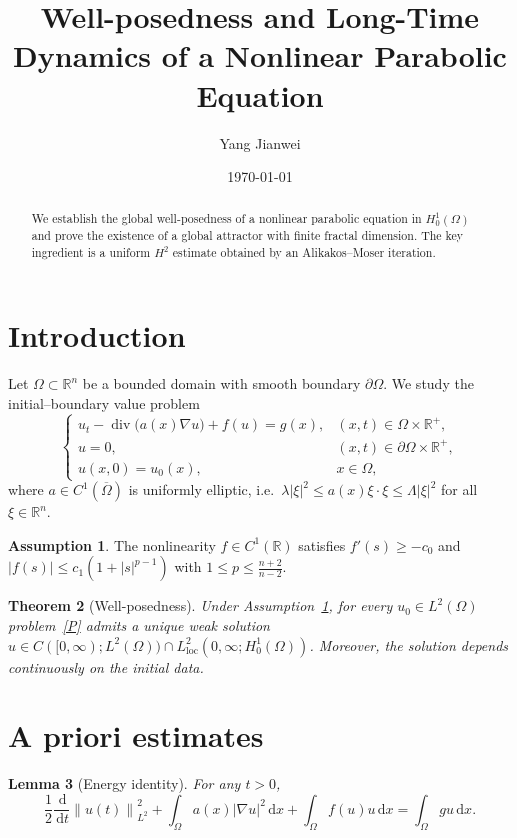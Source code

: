 \documentclass[11pt,a4paper]{article}
\title{Well-posedness and Long-Time Dynamics of a Nonlinear Parabolic Equation}
\author{Yang Jianwei}
\date{\today}
\newtheorem{theorem}{Theorem}[section]
\newtheorem{lemma}[theorem]{Lemma}
\theoremstyle{definition}
\newtheorem{assumption}[theorem]{Assumption}
\theoremstyle{remark}
\newcommand{\R}{\mathbb{R}}
\newcommand{\Om}{\Omega}
\newcommand{\paOm}{\partial\Omega}
\newcommand{\norm}[1]{\left\lVert #1\right\rVert}
\newcommand{\dd}{\,\mathrm{d}}
\DeclareMathOperator{\divg}{div}
\newcommand{\pde}[1]{\eqref{#1}}
\begin{document}
\maketitle

\begin{abstract}
We establish the global well-posedness of a nonlinear parabolic equation
in $H^1_0(\Omega)$ and prove the existence of a global attractor with
finite fractal dimension. The key ingredient is a uniform
$H^2$ estimate obtained by an Alikakos--Moser iteration.
\end{abstract}

\section{Introduction}

Let $\Om\subset\R^n$ be a bounded domain with smooth boundary $\paOm$.
We study the initial--boundary value problem
\begin{equation}\label{P}
  \begin{cases}
    u_t - \divg\bigl(a(x)\nabla u\bigr) + f(u) = g(x), & (x,t)\in\Om\times\R^+,\\[2pt]
    u = 0, & (x,t)\in\paOm\times\R^+,\\[2pt]
    u(x,0)=u_0(x), & x\in\Om,
  \end{cases}
\end{equation}
where $a\in C^1(\overline\Om)$ is uniformly elliptic, i.e.\
$\lambda|\xi|^2\le a(x)\xi\cdot\xi\le\Lambda|\xi|^2$ for all
$\xi\in\R^n$.

\begin{assumption}\label{A1}
The nonlinearity $f\in C^1(\R)$ satisfies
$f'(s)\ge -c_0$ and $|f(s)|\le c_1(1+|s|^{p-1})$ with
$1\le p\le \frac{n+2}{n-2}$.
\end{assumption}

\begin{theorem}[Well-posedness]\label{T1}
Under Assumption~\ref{A1}, for every $u_0\in L^2(\Om)$ problem~\pde{P}
admits a unique weak solution
$u\in C([0,\infty);L^2(\Om))\cap L^2_{\mathrm{loc}}(0,\infty;H^1_0(\Om))$.
Moreover, the solution depends continuously on the initial data.
\end{theorem}

\section{A priori estimates}

\begin{lemma}[Energy identity]\label{L1}
For any $t>0$,
\begin{equation}
  \frac12\frac{\dd}{\dd t}\norm{u(t)}_{L^2}^2
  + \int_{\Om}a(x)|\nabla u|^2\dd x
  + \int_{\Om}f(u)u\dd x
  = \int_{\Om}gu\dd x .
\end{equation}
\end{lemma}
\end{document}
